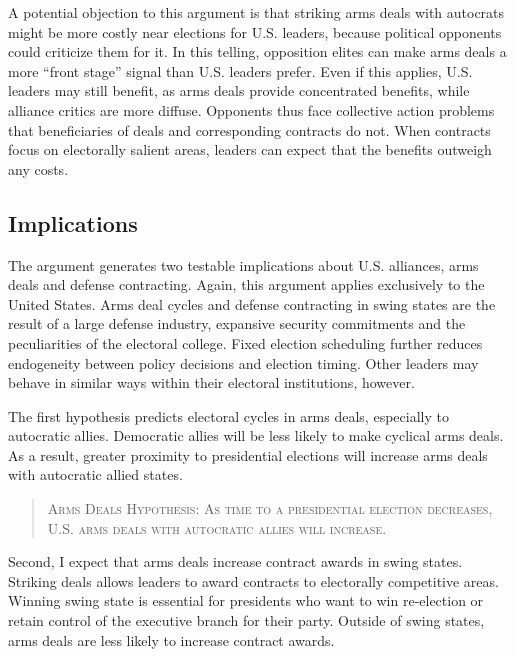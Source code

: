 \documentclass[12pt]{article}
\begin{document}
A potential objection to this argument is that striking arms deals with autocrats might be more costly near elections for U.S. leaders, because political opponents could criticize them for it. 
In this telling, opposition elites can make arms deals a more ``front stage'' signal than U.S. leaders prefer. 
Even if this applies, U.S. leaders may still benefit, as arms deals provide concentrated benefits, while alliance critics are more diffuse.
Opponents thus face collective action problems that beneficiaries of deals and corresponding contracts do not. 
When contracts focus on electorally salient areas, leaders can expect that the benefits outweigh any costs. 



\subsection{Implications}


The argument generates two testable implications about U.S. alliances, arms deals and defense contracting. 
Again, this argument applies exclusively to the United States.  
Arms deal cycles and defense contracting in swing states are the result of a large defense industry, expansive security commitments and the peculiarities of the electoral college. 
Fixed election scheduling further reduces endogeneity between policy decisions and election timing. 
Other leaders may behave in similar ways within their electoral institutions, however. 


The first hypothesis predicts electoral cycles in arms deals, especially to autocratic allies.
Democratic allies will be less likely to make cyclical arms deals. 
As a result, greater proximity to presidential elections will increase arms deals with autocratic allied states. 


\begin{quote}
\textsc{Arms Deals Hypothesis: As time to a presidential election decreases, U.S. arms deals with autocratic allies will increase.}
\end{quote}


Second, I expect that arms deals increase contract awards in swing states.
Striking deals allows leaders to award contracts to electorally competitive areas. 
Winning swing state is essential for presidents who want to win re-election or retain control of the executive branch for their party. 
Outside of swing states, arms deals are less likely to increase contract awards. 
\end{document}
